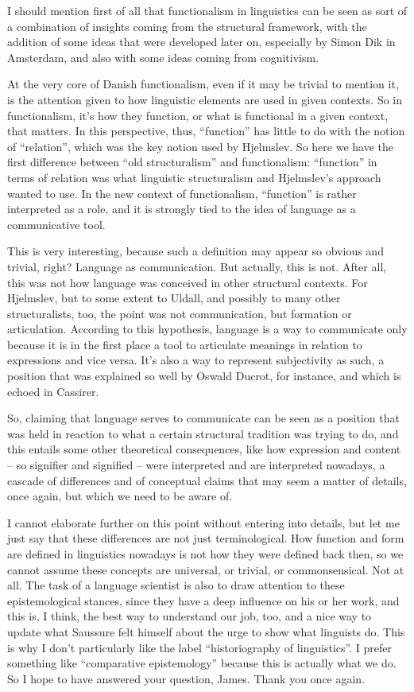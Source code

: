 \documentclass[output=paper]{langscibook}
\begin{document}
I should mention first of all that functionalism in linguistics can be seen as sort of a combination of insights coming from the structural framework, with the addition of some ideas that were developed later on, especially by Simon Dik in Amsterdam, and also with some ideas coming from cognitivism. 

At the very core of Danish functionalism, even if it may be trivial to mention it, is the attention given to how linguistic elements are used in given contexts. So in functionalism, it’s how they function, or what is functional in a given context, that matters. In this perspective, thus, “function” has little to do with the notion of “relation”, which was the key notion used by Hjelmslev. So here we have the first difference between “old structuralism” and functionalism: “function” in terms of relation was what linguistic structuralism and Hjelmslev’s approach wanted to use. In the new context of functionalism, “function” is rather interpreted as a role, and it is strongly tied to the idea of language as a communicative tool. 

This is very interesting, because such a definition may appear so obvious and trivial, right? Language as communication. But actually, this is not. After all, this was not how language was conceived in other structural contexts. For Hjelmslev, but to some extent to Uldall, and possibly to many other structuralists, too, the point was not communication, but formation or articulation. According to this hypothesis, language is a way to communicate only because it is in the first place a tool to articulate meanings in relation to expressions and vice versa. It’s also a way to represent subjectivity as such, a position that was explained so well by Oswald Ducrot, for instance, and which is echoed in Cassirer.

So, claiming that language serves to communicate can be seen as a position that was held in reaction to what a certain structural tradition was trying to do, and this entails some other theoretical consequences, like how expression and content – so signifier and signified – were interpreted and are interpreted nowadays, a cascade of differences and of conceptual claims that may seem a matter of details, once again, but which we need to be aware of. 

I cannot elaborate further on this point without entering into details, but let me just say that these differences are not just terminological. How function and form are defined in linguistics nowadays is not how they were defined back then, so we cannot assume these concepts are universal, or trivial, or commonsensical. Not at all. The task of a language scientist is also to draw attention to these epistemological stances, since they have a deep influence on his or her work, and this is, I think, the best way to understand our job, too, and a nice way to update what Saussure felt himself about the urge to show what linguists do. This is why I don’t particularly like the label “historiography of linguistics”. I prefer something like “comparative epistemology” because this is actually what we do. So I hope to have answered your question, James. Thank you once again.
\end{document}
